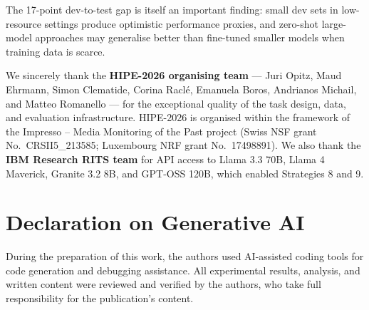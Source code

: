 \documentclass{ceurart}
\begin{document}
The 17-point dev-to-test gap is itself an important finding: small dev sets in low-resource settings produce optimistic performance proxies, and zero-shot large-model approaches may generalise better than fine-tuned smaller models when training data is scarce.

\begin{acknowledgments}
We sincerely thank the \textbf{HIPE-2026 organising team} --- Juri Opitz, Maud Ehrmann, Simon Clematide, Corina Racl\'{e}, Emanuela Boros, Andrianos Michail, and Matteo Romanello --- for the exceptional quality of the task design, data, and evaluation infrastructure. HIPE-2026 is organised within the framework of the Impresso -- Media Monitoring of the Past project (Swiss NSF grant No.~CRSII5\_213585; Luxembourg NRF grant No.~17498891). We also thank the \textbf{IBM Research RITS team} for API access to Llama 3.3 70B, Llama 4 Maverick, Granite 3.2 8B, and GPT-OSS 120B, which enabled Strategies 8 and 9.
\end{acknowledgments}

\section*{Declaration on Generative AI}
During the preparation of this work, the authors used AI-assisted coding tools for code generation and debugging assistance. All experimental results, analysis, and written content were reviewed and verified by the authors, who take full responsibility for the publication's content.


\nocite{opitz_overview_2026}
\end{document}
